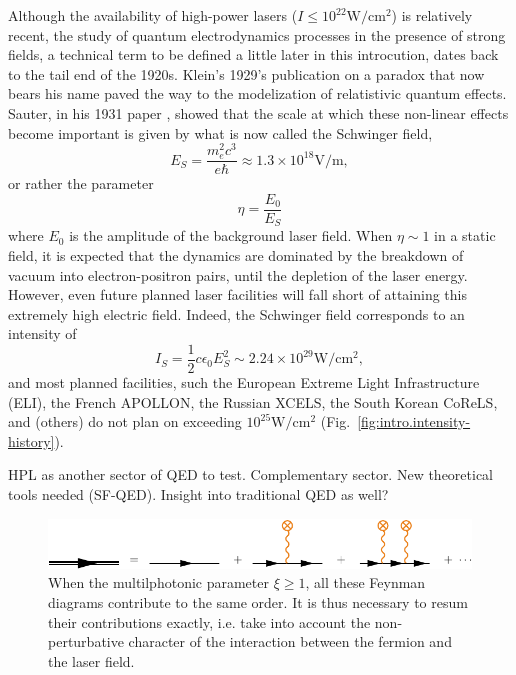 \documentclass[11pt,SymmetricalJury]{inrsthesis/inrsthesis}
\begin{document}
Although the availability of high-power lasers ($I\leq10^{22}\si{\watt\per\cm\squared}$)
is relatively recent, the study of quantum electrodynamics processes in the presence
of strong fields, a technical term to be defined a little later in this introcution,
dates back to the tail end of the 1920s. Klein's 1929's publication \cite{Klein1929} on a paradox
that now bears his name paved the way to the modelization of relatistivic
quantum effects. Sauter, in his 1931 paper \cite{Sauter1931}, showed that the scale at which
these non-linear effects become important is given by what is now called
the Schwinger field,
  \begin{equation}
    E_S = \frac{m_e^2c^3}{e\hbar} \approx 1.3\times10^{18}\si{\volt\per\meter},
  \end{equation}
or rather the parameter
  \begin{equation}
    \eta = \frac{E_0}{E_S}
  \end{equation}
where $E_0$ is the amplitude of the background laser field. When $\eta\sim1$
in a static field,
it is expected that the dynamics are dominated by the breakdown of vacuum
into electron-positron pairs, until the depletion of the laser energy.
However, even future planned laser facilities will fall short of attaining
this extremely high electric field. Indeed, the Schwinger field corresponds
to an intensity of
  \begin{equation}
    I_S = \frac{1}{2}c\epsilon_0E_S^2\sim 2.24\times10^{29}\si{\watt\per\cm\squared},
  \end{equation}
and most planned facilities, such the European Extreme Light Infrastructure (ELI),
the French APOLLON, the Russian XCELS, the South Korean CoReLS, and (others)
do not plan on exceeding $10^{25}\si{\watt\per\cm\squared}$ (Fig.~\ref{fig:intro.intensity-history}).

HPL as another sector of QED to test. Complementary sector. New theoretical tools
needed (SF-QED). Insight into traditional QED as well?



\begin{figure}
  \centering
  \includegraphics{figs/ResummedPropagator.pdf}
  \caption[Resummation of multiphotonic effects on the fermion propagator.]
          {When the multilphotonic parameter $\xi\geq1$, all these Feynman
          diagrams contribute to the same order. It is thus necessary to
          resum their contributions exactly, i.e. take into account
          the non-perturbative character of the interaction between the
          fermion and the laser field.}
  \label{fig:intro.resummed-propagator}
\end{figure}
\end{document}
